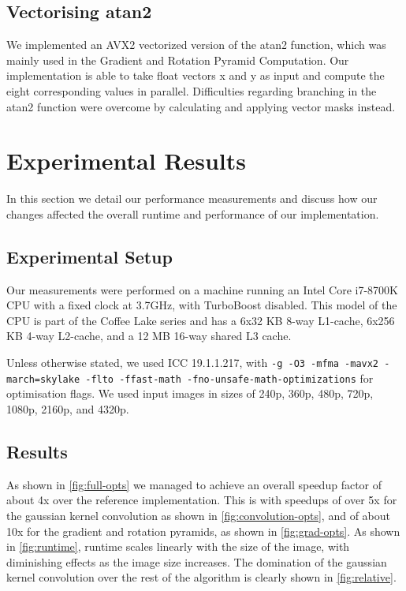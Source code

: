 \documentclass[letterpaper]{article}
\begin{document}
\subsection*{Vectorising atan2}
We implemented an AVX2 vectorized version of the atan2 function, which was mainly used in the Gradient and Rotation Pyramid Computation. Our implementation is able to take  float vectors x and y as input and compute the eight corresponding values in parallel. Difficulties regarding branching in the atan2 function were overcome by calculating and applying vector masks instead.

\section{Experimental Results}\label{sec:results}
In this section we detail our performance measurements and discuss how our changes affected the overall runtime and performance of our implementation.

\subsection*{Experimental Setup}
Our measurements were performed on a machine running an Intel Core i7-8700K CPU with a fixed clock at 3.7GHz, with TurboBoost disabled. This model of the CPU is part of the Coffee Lake series and has a 6x32 KB 8-way L1-cache, 6x256 KB 4-way L2-cache, and a 12 MB 16-way shared L3 cache.

Unless otherwise stated, we used ICC 19.1.1.217, with \texttt{-g -O3 -mfma -mavx2 -march=skylake -flto -ffast-math -fno-unsafe-math-optimizations} for optimisation flags. We used input images in sizes of 240p, 360p, 480p, 720p, 1080p, 2160p, and 4320p.

\subsection*{Results}
As shown in \autoref{fig:full-opts} we managed to achieve an overall speedup factor of about 4x over the reference implementation. This is with speedups of over 5x for the gaussian kernel convolution as shown in \autoref{fig:convolution-opts}, and of about 10x for the gradient and rotation pyramids, as shown in \autoref{fig:grad-opts}. As shown in \autoref{fig:runtime}, runtime scales linearly with the size of the image, with diminishing effects as the image size increases. The domination of the gaussian kernel convolution over the rest of the algorithm is clearly shown in \autoref{fig:relative}.
\end{document}
